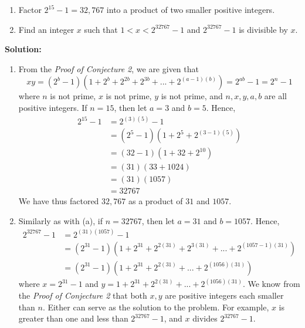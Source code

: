 \begin{enumerate}[label=(\alph*)]
    \item Factor $2^{15}-1=32,767$ into a product of two smaller positive integers.
    \item Find an integer $x$ such that $1<x<2^{32767}-1$ and $2^{32767}-1$ is divisible by $x$.
\end{enumerate}

\textbf{Solution:}
\begin{enumerate}[label=(\alph*)]
   \item From the \textit{Proof of Conjecture 2}, we are given that
   $$xy=(2^b-1)(1+2^b+2^{2b}+2^{3b}+...+2^{(a-1)(b)})=2^{ab}-1=2^n-1$$
   where $n$ is not prime, $x$ is not prime, $y$ is not prime, and $n,x,y,a,b$ are all positive integers. If $n=15$, then let $a=3$ and $b=5$. Hence, 
   \begin{align*}
       2^{15}-1 &= 2^{(3)(5)}-1 \\
       &= (2^5-1)(1+2^5+2^{(3-1)(5)})\\
       &= (32-1)(1+32+2^{10})\\
       &= (31)(33+1024)\\
       &= (31)(1057)\\
       &= 32767
   \end{align*}
   We have thus factored $32,767$ as a product of $31$ and $1057$.

   \item Similarly as with (a), if $n=32767$, then let $a=31$ and $b=1057$. Hence, 
   \begin{align*}
       2^{32767}-1 &= 2^{(31)(1057)}-1 \\
       &= (2^{31}-1)(1+2^{31}+2^{2(31)}+2^{3(31)}+...+2^{(1057-1)(31)})\\
       &= (2^{31}-1)(1+2^{31}+2^{2(31)}+...+2^{(1056)(31)})
   \end{align*}
   where $x=2^{31}-1$ and $y=1+2^{31}+2^{2(31)}+...+2^{(1056)(31)}$. We know from the \textit{Proof of Conjecture 2} that both $x,y$ are positive integers each smaller than $n$. Either can serve as the solution to the problem. For example, $x$ is greater than one and less than $2^{32767}-1$, and $x$ divides $2^{32767}-1$.
\end{enumerate}

\pagebreak